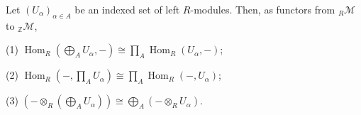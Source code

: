 Let $(U_\alpha)_{\alpha \in A}$ be an indexed set of left $R$-modules. Then, as functors from ${}_R\mathcal{M}$ to ${}_{\mathbb{Z}}\mathcal{M}$,

(1) $\operatorname{Hom}_R(\bigoplus_A U_\alpha, -) \cong \prod_A \operatorname{Hom}_R(U_\alpha, -)$;

(2) $\operatorname{Hom}_R(-, \prod_A U_\alpha) \cong \prod_A \operatorname{Hom}_R(-, U_\alpha)$;

(3) $(- \otimes_R (\bigoplus_A U_\alpha)) \cong \bigoplus_A (- \otimes_R U_\alpha)$.
